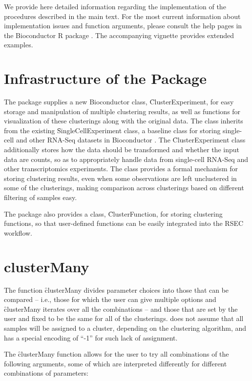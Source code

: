 We provide here detailed information regarding the implementation of the procedures described in the main text. For the most current information about implementation issues and function arguments, please consult the help pages in the Bioconductor R package \CE. The accompanying vignette provides  extended examples.
	
	
\section{Infrastructure of the \CE Package}

The \CE package supplies a new Bioconductor class, \f{ClusterExperiment}, for easy storage and manipulation of multiple clustering results, as well as functions for visualization of these clusterings along with the original data. The class inherits from the existing \f{SingleCellExperiment} class, a baseline class for storing single-cell and other RNA-Seq datasets in Bioconductor \cite{singlecellexperiment}. The \f{ClusterExperiment} class additionally stores how the data should be transformed and whether the input data are counts, so as to appropriately handle data from single-cell RNA-Seq and other transcriptomics experiments. The class provides a formal mechanism for storing clustering results, even when some observations are left unclustered in some of the clusterings, making comparison across clusterings based on different filtering of samples easy.

The \CE package also provides a class, \f{ClusterFunction}, for storing clustering functions, so that user-defined functions can be easily integrated into the RSEC workflow.

\section{clusterMany}\label{supp:clusterMany}

The function \f{clusterMany} divides parameter choices into those that can be compared -- i.e., those for which the user can give multiple options and \f{clusterMany} iterates over all the combinations -- and those that are set by the user and fixed to be the same for all of the clusterings. \CE does not assume that all samples will be assigned to a cluster, depending on the clustering algorithm, and has a special encoding of ``-1'' for such lack of assignment. 

The \f{clusterMany} function allows for the user to try all combinations of the following arguments, some of which are interpreted differently for different combinations of parameters: 

